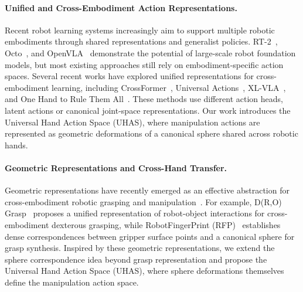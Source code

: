 \paragraph{Unified and Cross-Embodiment Action Representations.}
Recent robot learning systems increasingly aim to support multiple robotic embodiments through shared representations and generalist policies. RT-2~\cite{brohan2023rt2visionlanguageactionmodelstransfer}, Octo~\cite{team2024octo}, and OpenVLA~\cite{kim2024openvla} demonstrate the potential of large-scale robot foundation models, but most existing approaches still rely on embodiment-specific action spaces. Several recent works have explored unified representations for cross-embodiment learning, including CrossFormer~\cite{doshi2024scaling}, Universal Actions~\cite{zheng2025universal}, XL-VLA~\cite{jiang2026cross}, and One Hand to Rule Them All~\cite{wei2026one}. These methods use different action heads, latent actions or canonical joint-space representations. Our work introduces the Universal Hand Action Space (UHAS), where manipulation actions are represented as geometric deformations of a canonical sphere shared across robotic hands.


\vspace{-2mm}
\paragraph{Geometric Representations and Cross-Hand Transfer.}
Geometric representations have recently emerged as an effective abstraction for cross-embodiment robotic grasping and manipulation~\cite{wei2024mathcal,khargonkar2024robotfingerprint,fei2025t,wu2025cedex,wu2026dexgrasp,he2026generate}. For example, D(R,O) Grasp~\cite{wei2024mathcal} proposes a unified representation of robot-object interactions for cross-embodiment dexterous grasping, while RobotFingerPrint (RFP)~\cite{khargonkar2024robotfingerprint} establishes dense correspondences between gripper surface points and a canonical sphere for grasp synthesis. Inspired by these geometric representations, we extend the sphere correspondence idea beyond grasp representation and propose the Universal Hand Action Space (UHAS), where sphere deformations themselves define the manipulation action space. 

